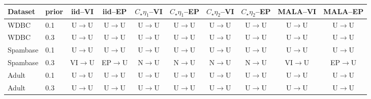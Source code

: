 \begin{tabular}{llcccccccc}
\toprule
Dataset & prior & iid--VI & iid--EP & $C_\star\eta_1$--VI & $C_\star\eta_1$--EP & $C_\star\eta_2$--VI & $C_\star\eta_2$--EP & MALA--VI & MALA--EP \\
\midrule
WDBC & 0.1 & U$\to$U & U$\to$U & U$\to$U & U$\to$U & U$\to$U & U$\to$U & U$\to$U & U$\to$U \\
WDBC & 0.3 & U$\to$U & U$\to$U & U$\to$U & U$\to$U & U$\to$U & U$\to$U & U$\to$U & U$\to$U \\
Spambase & 0.1 & U$\to$U & U$\to$U & U$\to$U & U$\to$U & U$\to$U & U$\to$U & U$\to$U & U$\to$U \\
Spambase & 0.3 & VI$\to$U & EP$\to$U & N$\to$U & N$\to$U & N$\to$U & N$\to$U & VI$\to$U & EP$\to$U \\
Adult & 0.1 & U$\to$U & U$\to$U & U$\to$U & U$\to$U & U$\to$U & U$\to$U & U$\to$U & U$\to$U \\
Adult & 0.3 & U$\to$U & U$\to$U & U$\to$U & U$\to$U & U$\to$U & U$\to$U & U$\to$U & U$\to$U \\
\bottomrule
\end{tabular}
